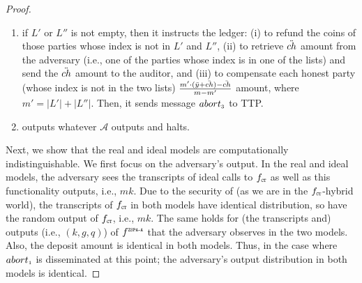 \begin{proof}
\begin{enumerate}
\begin{enumerate}
%
\item if  $  L'$ or $  L''$ is not empty, then it instructs the ledger: (i) to refund the coins of those parties whose index is not in $  L'$ and $  L''$, (ii) to retrieve $\ddot{ch}$ amount from the adversary (i.e., one of the parties whose index is in one of the lists) and send the $\ddot{ch}$ amount to the auditor, and (iii) to compensate each honest party (whose index is not in the two lists)  $\frac{m'\cdot (\ddot{y}+\ddot{ch})-\ddot{ch}}{m-m'}$ amount, where $m'=|  L'|+|  L''|$.  Then, it sends  message $abort_{\scriptscriptstyle 3}$ to TTP. 
%
\item outputs whatever $\mathcal{A}$ outputs and halts. 
 \end{enumerate}
%
\end{enumerate}

Next, we show that the real and ideal models are computationally indistinguishable. We first focus on the adversary’s output. In the real and ideal models, the adversary sees the transcripts of ideal calls to $f_{\scriptscriptstyle \mathtt{CT}}$ as well as this functionality outputs, i.e., $mk$. Due to the security of \ct (as we are in the $f_{\scriptscriptstyle \mathtt{CT}}$-hybrid world), the transcripts of $f_{\scriptscriptstyle \mathtt{CT}}$ in both models have identical distribution, so have the random output of $f_{\scriptscriptstyle \mathtt{CT}}$, i.e., $mk$. The same holds for (the transcripts and) outputs (i.e., $(  k,   g,   q)$) of $f^{\scriptscriptstyle \mathtt{ZSPA\text{-}A}}$ that the adversary observes in the two models. Also, the deposit amount is identical in both models. Thus, in the case where $abort_{\scriptscriptstyle 1}$ is disseminated at this point; the adversary's output distribution in both models is identical. 




\end{proof}
